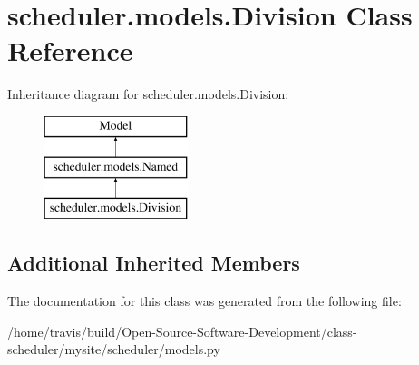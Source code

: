 \hypertarget{classscheduler_1_1models_1_1_division}{\section{scheduler.\-models.\-Division Class Reference}
\label{classscheduler_1_1models_1_1_division}
}
Inheritance diagram for scheduler.\-models.\-Division\-:\begin{figure}[H]
\begin{center}
\leavevmode
\includegraphics[height=3.000000cm]{classscheduler_1_1models_1_1_division}
\end{center}
\end{figure}
\subsection*{Additional Inherited Members}


The documentation for this class was generated from the following file\-:\begin{DoxyCompactItemize}
\item 
/home/travis/build/\-Open-\/\-Source-\/\-Software-\/\-Development/class-\/scheduler/mysite/scheduler/models.\-py\end{DoxyCompactItemize}
